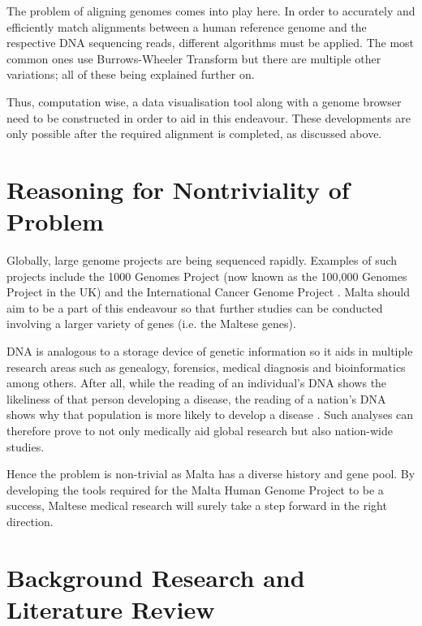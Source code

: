 \documentclass{csfyp}
\begin{document}
The problem of aligning genomes comes into play here.  In order to accurately and efficiently match alignments between a human reference genome and the respective DNA sequencing reads, different algorithms must be applied.  The most common ones use Burrows-Wheeler Transform \cite{bwtransform, cgreads} but there are multiple other variations; all of these being explained further on.  

Thus, computation wise, a data visualisation tool along with a genome browser need to be constructed in order to aid in this endeavour.  These developments are only possible after the required alignment is completed, as discussed above.  


\section{Reasoning for Nontriviality of Problem}\vspace{-2ex}

Globally, large genome projects are being sequenced rapidly.  Examples of such projects include the 1000 Genomes Project (now known as the 100,000 Genomes Project in the UK) and the International Cancer Genome Project \cite{bwtransform, refcompression, popgen}.  Malta should aim to be a part of this endeavour so that further studies can be conducted involving a larger variety of genes (i.e. the Maltese genes).  

DNA is analogous to a storage device of genetic information so it aids in multiple research areas such as genealogy, forensics, medical diagnosis and bioinformatics among others.  After all, while the reading of an individual's DNA shows the likeliness of that person developing a disease, the reading of a nation’s DNA shows why that population is more likely to develop a disease \cite{think}.  Such analyses can therefore prove to not only medically aid global research but also nation-wide studies.

Hence the problem is non-trivial as Malta has a diverse history and gene pool.  By developing the tools required for the Malta Human Genome Project to be a success, Maltese medical research will surely take a step forward in the right direction.              


\section{Background Research and Literature Review}\vspace{-2ex}
\end{document}
